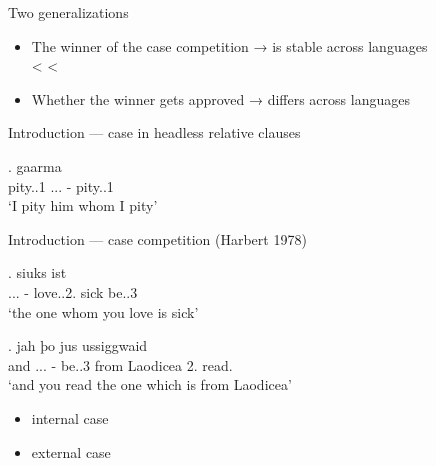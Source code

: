 \documentclass[xcolor=dvipsnames,10pt]{beamer}
\begin{document}
\begin{frame}{Two generalizations}

\begin{itemize}
  \item The winner of the case competition → is stable across languages\\
   <  < 
  \item Whether the winner gets approved → differs across languages\\

\end{itemize}



\end{frame}
















\begin{frame}{Introduction --- case in headless relative clauses}

\exg. gaarma   \\
 pity..1\textcolor{LimeGreen}{\scsub{[acc]}} ...\textcolor{LimeGreen}{} - pity..1\textcolor{LimeGreen}{\scsub{[acc]}}\\
 `I pity him whom I pity' 

\end{frame}

\begin{frame}{Introduction --- case competition (Harbert 1978)}

\exg.    siuks ist\\
 ...\textcolor{LimeGreen}{} - love..2.\textcolor{LimeGreen}{\scsub{[acc]}} sick be..3\textcolor{Turquoise}{\scsub{[nom]}}\\
 `the one whom you love is sick' 



\exg. jah þo     jus ussiggwaid\\
 and ...\textcolor{LimeGreen}{} - be..3\textcolor{Turquoise}{\scsub{[nom]}} from Laodicea 2. read.\textcolor{LimeGreen}{\scsub{[acc]}}\\
 `and you read the one which is from Laodicea' 



 \begin{itemize}
   \item internal case
   \item external case
 \end{itemize}


\end{frame}
\end{document}
